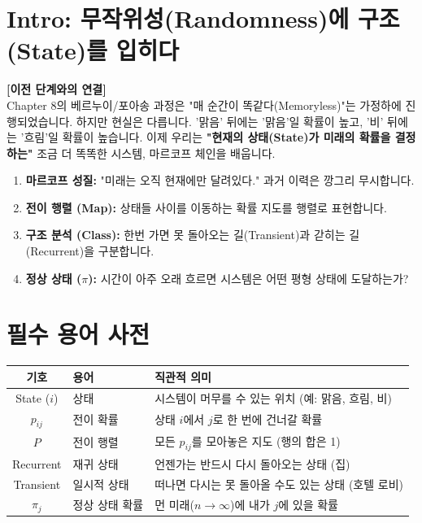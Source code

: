 \documentclass[11pt,a4paper]{book}
\theoremstyle{definition}
\begin{document}
\begin{warningbox}[title={기하 분포와 지수 분포의 관계}]
\section*{Intro: 무작위성(Randomness)에 구조(State)를 입히다}

\textbf{[이전 단계와의 연결]} \\
Chapter 8의 베르누이/포아송 과정은 "매 순간이 똑같다(Memoryless)"는 가정하에 진행되었습니다. 하지만 현실은 다릅니다. '맑음' 뒤에는 '맑음'일 확률이 높고, '비' 뒤에는 '흐림'일 확률이 높습니다.
이제 우리는 \textbf{"현재의 상태(State)가 미래의 확률을 결정하는"} 조금 더 똑똑한 시스템, 마르코프 체인을 배웁니다.

\begin{tcolorbox}[colback=subgray, title={\textbf{📌 이 단원의 핵심 개요 (Overview)}}]
\begin{enumerate}
    \item \textbf{마르코프 성질:} "미래는 오직 현재에만 달려있다." 과거 이력은 깡그리 무시합니다.
    \item \textbf{전이 행렬 (Map):} 상태들 사이를 이동하는 확률 지도를 행렬로 표현합니다.
    \item \textbf{구조 분석 (Class):} 한번 가면 못 돌아오는 길(Transient)과 갇히는 길(Recurrent)을 구분합니다.
    \item \textbf{정상 상태 ($\pi$):} 시간이 아주 오래 흐르면 시스템은 어떤 평형 상태에 도달하는가?
\end{enumerate}
\end{tcolorbox}

\section{필수 용어 사전}

\begin{center}
\begin{tabular}{|c|l|l|}
\hline
\rowcolor{mainblue!20} \textbf{기호} & \textbf{용어} & \textbf{직관적 의미} \\ \hline
State ($i$) & 상태 & 시스템이 머무를 수 있는 위치 (예: 맑음, 흐림, 비) \\ \hline
$p_{ij}$ & 전이 확률 & 상태 $i$에서 $j$로 한 번에 건너갈 확률 \\ \hline
$P$ & 전이 행렬 & 모든 $p_{ij}$를 모아놓은 지도 (행의 합은 1) \\ \hline
Recurrent & 재귀 상태 & 언젠가는 반드시 다시 돌아오는 상태 (집) \\ \hline
Transient & 일시적 상태 & 떠나면 다시는 못 돌아올 수도 있는 상태 (호텔 로비) \\ \hline
$\pi_j$ & 정상 상태 확률 & 먼 미래($n \to \infty$)에 내가 $j$에 있을 확률 \\ \hline
\end{tabular}
\end{center}


\end{warningbox}
\end{document}

